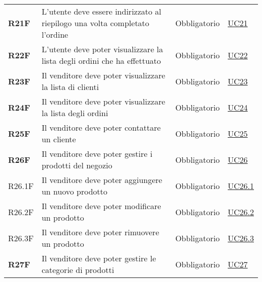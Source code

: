\begin{center}
\begin{longtable}[!h]{p{50px} p{245px} p{75px} p{50px}}
        \textbf{R21F}                         & L'utente deve essere indirizzato al riepilogo una volta completato l'ordine                                & Obbligatorio             & \hyperref[sec:UC21]{UC21}                    \\
        \textbf{R22F}                         & L'utente deve poter visualizzare la lista degli ordini che ha effettuato                                   & Obbligatorio             & \hyperref[sec:UC22]{UC22}                    \\
        \textbf{R23F}                         & Il venditore deve poter visualizzare la lista di clienti                                                   & Obbligatorio             & \hyperref[sec:UC23]{UC23}                    \\
        \textbf{R24F}                         & Il venditore deve poter visualizzare la lista degli ordini                                                 & Obbligatorio             & \hyperref[sec:UC24]{UC24}                    \\
        \textbf{R25F}                         & Il venditore deve poter contattare un cliente                                                              & Obbligatorio             & \hyperref[sec:UC25]{UC25}                    \\
        \textbf{R26F}                         & Il venditore deve poter gestire i prodotti del negozio                                                     & Obbligatorio             & \hyperref[sec:UC26]{UC26}                    \\
        R26.1F                                & Il venditore deve poter aggiungere un nuovo prodotto                                                       & Obbligatorio             & \hyperref[sec:UC26.1]{UC26.1}                \\
        R26.2F                                & Il venditore deve poter modificare un prodotto                                                             & Obbligatorio             & \hyperref[sec:UC26.2]{UC26.2}                \\
        R26.3F                                & Il venditore deve poter rimuovere un prodotto                                                              & Obbligatorio             & \hyperref[sec:UC26.3]{UC26.3}                \\
        \textbf{R27F}                         & Il venditore deve poter gestire le categorie di prodotti                                                   & Obbligatorio             & \hyperref[sec:UC27]{UC27}                    \\

\end{longtable}
\end{center}
